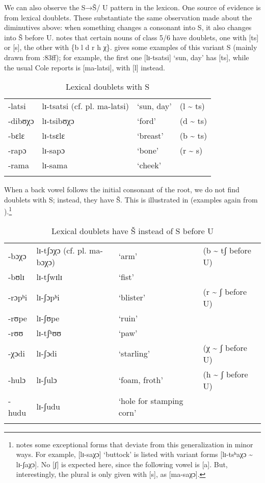 We can also observe the S→Š/ {\longrule} U pattern in the lexicon. One source of evidence is from lexical doublets. These substantiate the same observation made about the diminutives above: when something changes a consonant into S, it also changes into Š before U. \citet[83ff]{Cole1955} notes that certain nouns of class 5/6 have doublets, one with [ts] or [s], the other with \{b l d r h χ\}.  gives some examples of this variant S (mainly drawn from \citealt{Cole1955}:83ff); for example, the first one [lɪ-tsatsi] ‘sun, day’ has [ts], while the usual  Cole reports is [ma-latsi], with [l] instead.
%
\begin{table}
\begin{tabularx}{\textwidth}{llXX}
\lsptoprule

-latsi & lɪ-tsatsi (cf. pl. ma-latsi) & ‘sun, day’ & (l {\textasciitilde} ts)\\
-dibʊχɔ & lɪ-tsibʊχɔ & ‘ford’ & (d {\textasciitilde} ts)\\
-bɛlɛ & lɪ-tsɛlɛ & ‘breast’ & (b {\textasciitilde} ts)\\
-rapɔ & lɪ-sapɔ & ‘bone’ & (r {\textasciitilde} s) \\
-rama & lɪ-sama & ‘cheek’ & \\
\lspbottomrule
\end{tabularx}
\caption{Lexical doublets with S}
\label{tab:bennett:4}
\end{table}

When a back vowel follows the initial consonant of the root, we do not find doublets with S; instead, they have Š. This is illustrated in  (examples again from \citealt{Cole1955}).\footnote{\citet[83]{Cole1955} notes some exceptional forms that deviate from this generalization in minor ways. For example, [lɪ-saχɔ] ‘buttock’ is listed with variant forms [lɪ-tsʰaχɔ {\textasciitilde} lɪ-ʃaχɔ]. No [ʃ] is expected here, since the following vowel is [a]. But, interestingly, the plural is only given with [s], as [ma-saχɔ].}
\begin{table}
\begin{tabularx}{\textwidth}{lllX}
\lsptoprule

-bɔχɔ & lɪ-tʃɔχɔ
(cf. pl. ma-bɔχɔ) & ‘arm’ & (b {\textasciitilde} tʃ before U)\\
-bʊlɪ & lɪ-tʃwɪlɪ & ‘fist’ & \\
-rɔpʰi & lɪ-ʃɔpʰi & ‘blister’ & (r {\textasciitilde} ʃ before U)\\
-rʊpe & lɪ-ʃʊpe & ‘ruin’ & \\
-rʊʊ & lɪ-tʃʰʊʊ & ‘paw’ & \\
-χɔdi & lɪ-ʃɔdi & ‘starling’ & (χ {\textasciitilde} ʃ before U)\\
-hulɔ & lɪ-ʃulɔ & ‘foam, froth’ & (h {\textasciitilde} ʃ before U)\\
-hudu & lɪ-ʃudu & ‘hole for stamping corn’ & \\
\lspbottomrule
\end{tabularx}
\caption{Lexical doublets have Š instead of S before U}
\label{tab:bennett:5}
\end{table}

